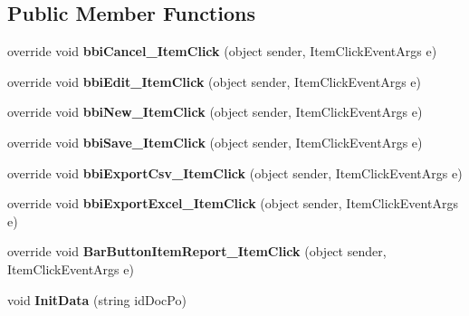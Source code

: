 \subsection*{Public Member Functions}
\begin{DoxyCompactItemize}
\item 
\mbox{\label{class_h_k_supply_1_1_forms_1_1_supply_1_1_purchase_order_a8d43fe9a3464454e6a4815c3ee878fed}} 
override void {\bfseries bbi\+Cancel\+\_\+\+Item\+Click} (object sender, Item\+Click\+Event\+Args e)
\item 
\mbox{\label{class_h_k_supply_1_1_forms_1_1_supply_1_1_purchase_order_a4f11eef669d90908dc4016330068d6ae}} 
override void {\bfseries bbi\+Edit\+\_\+\+Item\+Click} (object sender, Item\+Click\+Event\+Args e)
\item 
\mbox{\label{class_h_k_supply_1_1_forms_1_1_supply_1_1_purchase_order_a55a053868a8a27b002a67d0c6c821ae7}} 
override void {\bfseries bbi\+New\+\_\+\+Item\+Click} (object sender, Item\+Click\+Event\+Args e)
\item 
\mbox{\label{class_h_k_supply_1_1_forms_1_1_supply_1_1_purchase_order_a00a943e19de89cbdffc33d387085cedf}} 
override void {\bfseries bbi\+Save\+\_\+\+Item\+Click} (object sender, Item\+Click\+Event\+Args e)
\item 
\mbox{\label{class_h_k_supply_1_1_forms_1_1_supply_1_1_purchase_order_aa130202d283caf79f3854ebc27965af5}} 
override void {\bfseries bbi\+Export\+Csv\+\_\+\+Item\+Click} (object sender, Item\+Click\+Event\+Args e)
\item 
\mbox{\label{class_h_k_supply_1_1_forms_1_1_supply_1_1_purchase_order_acb2989469ba865f565c6d7555d65d565}} 
override void {\bfseries bbi\+Export\+Excel\+\_\+\+Item\+Click} (object sender, Item\+Click\+Event\+Args e)
\item 
\mbox{\label{class_h_k_supply_1_1_forms_1_1_supply_1_1_purchase_order_a6d4eae0844f1635706cc7edab3086186}} 
override void {\bfseries Bar\+Button\+Item\+Report\+\_\+\+Item\+Click} (object sender, Item\+Click\+Event\+Args e)
\item 
\mbox{\label{class_h_k_supply_1_1_forms_1_1_supply_1_1_purchase_order_ae7a32f3968641a71aedec24274cfbee1}} 
void {\bfseries Init\+Data} (string id\+Doc\+Po)
\end{DoxyCompactItemize}
